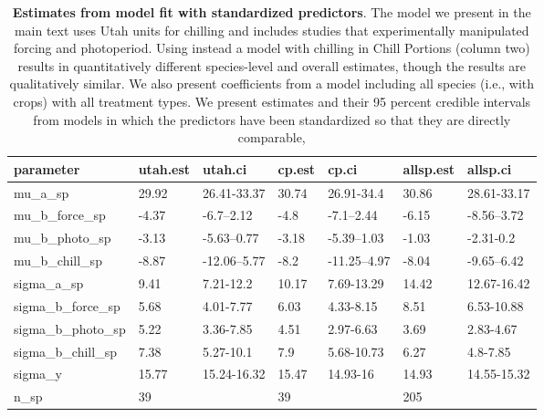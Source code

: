 \documentclass{article}
\begin{document}
\begin{table}[ht]
\centering
\caption{\textbf{Estimates from model fit with standardized predictors}. The model we present in the main text uses Utah units for chilling and includes studies that experimentally manipulated forcing and photoperiod. Using instead a model with chilling in Chill Portions (column two) results in quantitatively different species-level and overall estimates, though the results are qualitatively similar. We also present coefficients from a model including all species (i.e., with crops) with all treatment types. We present estimates and their 95 percent credible intervals from models in which the predictors have been standardized so that they are directly comparable,} 
\label{tab:methods}
\begingroup\footnotesize
\begin{tabular}{|p{}|p{}|p{}|p{}|p{}|p{}|p{}|}
  \hline
parameter & utah.est & utah.ci & cp.est & cp.ci & allsp.est & allsp.ci \\ 
  \hline
mu\_a\_sp & 29.92 & 26.41-33.37 & 30.74 & 26.91-34.4 & 30.86 & 28.61-33.17 \\ 
  mu\_b\_force\_sp & -4.37 & -6.7--2.12 & -4.8 & -7.1--2.44 & -6.15 & -8.56--3.72 \\ 
  mu\_b\_photo\_sp & -3.13 & -5.63--0.77 & -3.18 & -5.39--1.03 & -1.03 & -2.31-0.2 \\ 
  mu\_b\_chill\_sp & -8.87 & -12.06--5.77 & -8.2 & -11.25--4.97 & -8.04 & -9.65--6.42 \\ 
  sigma\_a\_sp & 9.41 & 7.21-12.2 & 10.17 & 7.69-13.29 & 14.42 & 12.67-16.42 \\ 
  sigma\_b\_force\_sp & 5.68 & 4.01-7.77 & 6.03 & 4.33-8.15 & 8.51 & 6.53-10.88 \\ 
  sigma\_b\_photo\_sp & 5.22 & 3.36-7.85 & 4.51 & 2.97-6.63 & 3.69 & 2.83-4.67 \\ 
  sigma\_b\_chill\_sp & 7.38 & 5.27-10.1 & 7.9 & 5.68-10.73 & 6.27 & 4.8-7.85 \\ 
  sigma\_y & 15.77 & 15.24-16.32 & 15.47 & 14.93-16 & 14.93 & 14.55-15.32 \\ 
   \hline
n\_sp & 39 &  & 39 &  & 205 &  \\ 
   \hline
\end{tabular}
\endgroup
\end{table}%
\end{document}
